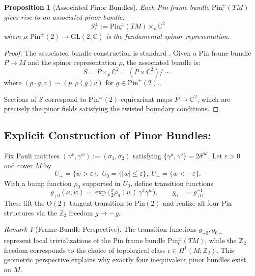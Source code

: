 \documentclass[11pt]{amsart}
\newtheorem{proposition}[theorem]{Proposition}
\theoremstyle{definition}
\theoremstyle{remark}
\newtheorem{remark}[theorem]{Remark}
\newcommand{\ZZ}{\mathbb{Z}}
\newcommand{\eps}{\varepsilon}
\begin{document}
\begin{proposition}[Associated Pinor Bundles]\label{prop:associated-pinor}
Each Pin frame bundle $\mathrm{Pin}^{\pm}_\epsilon(TM)$ gives rise to an associated pinor bundle:
\[
S^{\pm}_\epsilon := \mathrm{Pin}^{\pm}_\epsilon(TM) \times_{\rho} \mathbb{C}^2
\]
where $\rho: \mathrm{Pin}^{\pm}(2) \to \mathrm{GL}(2,\mathbb{C})$ is the fundamental spinor representation.
\end{proposition}

\begin{proof}
The associated bundle construction is standard \cite{Kobayashi1963,Steenrod1951}. Given a Pin frame bundle $P \to M$ and the spinor representation $\rho$, the associated bundle is:
\[
S = P \times_{\rho} \mathbb{C}^2 = (P \times \mathbb{C}^2) / \sim
\]
where $(p \cdot g, v) \sim (p, \rho(g)v)$ for $g \in \mathrm{Pin}^{\pm}(2)$.

Sections of $S$ correspond to $\mathrm{Pin}^{\pm}(2)$-equivariant maps $P \to \mathbb{C}^2$, which are precisely the pinor fields satisfying the twisted boundary conditions.
\end{proof}

\subsection{Explicit Construction of Pinor Bundles:}

Fix Pauli matrices $(\gamma^x,\gamma^w):=(\sigma_1,\sigma_2)$ satisfying $\{\gamma^\mu,\gamma^\nu\}=2\delta^{\mu\nu}$. Let $\eps>0$ and cover $M$ by
\[
U_{+}=\{w>\eps\},\;
U_{0}=\{|w|\le\eps\},\;
U_{-}=\{w<-\eps\}.
\]
With a bump function $\rho_0$ supported in $U_0$, define transition functions
\[
g_{+0}(x,w)=\exp\!\bigl(\tfrac{\pi}{2}\rho_0(w)\,\gamma^x\gamma^w\bigr),\qquad
g_{0-}=g_{+0}^{-1}.
\]
These lift the $\mathrm{O}(2)$ tangent transition to $\mathrm{Pin}(2)$ and realize all four Pin structures via the $\ZZ_2$ freedom $g\mapsto-\,g$.

\begin{remark}[Frame Bundle Perspective]
The transition functions $g_{+0}, g_{0-}$ represent local trivializations of the Pin frame bundle $\mathrm{Pin}^{\pm}_\epsilon(TM)$, while the $\ZZ_2$ freedom corresponds to the choice of topological class $\epsilon \in H^1(M; \ZZ_2)$. This geometric perspective explains why exactly four inequivalent pinor bundles exist on $M$.
\end{remark}

\end{document}
